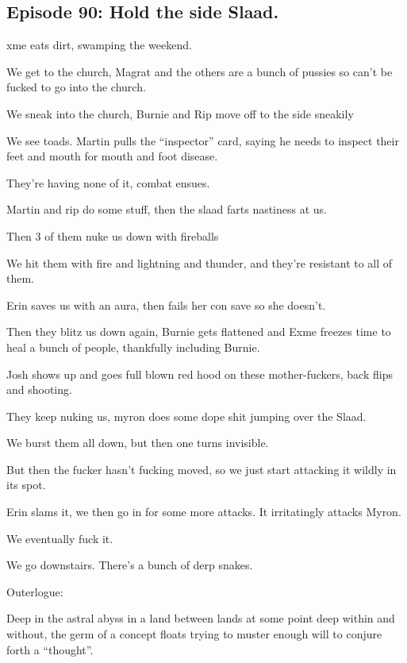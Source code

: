 \subsection{Episode 90: Hold the side Slaad.}

xme eats dirt, swamping the weekend.\medskip

We get to the church, Magrat and the others are a bunch of pussies so can’t be fucked to go into the church.\medskip

We sneak into the church, Burnie and Rip move off to the side sneakily\medskip

We see toads. Martin pulls the “inspector” card, saying he needs to inspect their feet and mouth for mouth and foot disease.\medskip

They’re having none of it, combat ensues.\medskip

Martin and rip do some stuff, then the slaad farts nastiness at us.\medskip

Then 3 of them nuke us down with fireballs\medskip

We hit them with fire and lightning and thunder, and they’re resistant to all of them.\medskip

Erin saves us with an aura, then fails her con save so she doesn’t.\medskip

Then they blitz us down again, Burnie gets flattened and Exme freezes time to heal a bunch of people, thankfully including Burnie.\medskip

Josh shows up and goes full blown red hood on these mother-fuckers, back flips and shooting.\medskip

They keep nuking us, myron does some dope shit jumping over the Slaad.\medskip

We burst them all down, but then one turns invisible.\medskip

But then the fucker hasn’t fucking moved, so we just start attacking it wildly in its spot.\medskip

Erin slams it, we then go in for some more attacks. It irritatingly attacks Myron.\medskip

We eventually fuck it.\medskip

We go downstairs. There’s a bunch of derp snakes.\medskip

Outerlogue:\medskip

Deep in the astral abyss in a land between lands at some point deep within and without, the germ of a concept floats trying to muster enough will to conjure forth a “thought”.\medskip

